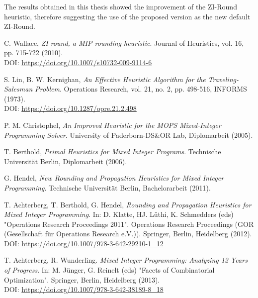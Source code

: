 \documentclass[a4paper,12pt,twoside]{scrbook}
\begin{document}
The results obtained in this thesis showed the improvement of the ZI-Round heuristic, therefore suggesting the use of the proposed version as the new default ZI-Round.

\backmatter

\renewcommand{\listalgorithmcfname}{Algorithms}
\listofalgocfs
\renewcommand{\listfigurename}{Figures}
\listoffigures
\renewcommand{\listtablename}{Tables}
\listoftables

\nocite{*}
\renewcommand{\bibname}{References}
\begin{thebibliography}{9}
	
	 C. Wallace, \textit{ZI round, a MIP rounding heuristic}. Journal of Heuristics, vol. 16, pp. 715-722 (2010). \\ DOI: \url{https://doi.org/10.1007/s10732-009-9114-6}

	 S. Lin, B. W. Kernighan, \textit{An Effective Heuristic Algorithm for the Traveling-Salesman Problem}. Operations Research, vol. 21, no. 2, pp. 498-516, INFORMS (1973). \\ DOI: \url{https://doi.org/10.1287/opre.21.2.498}

	 P. M. Christophel, \textit{An Improved Heuristic for the MOPS Mixed-Integer Programming Solver}. University of Paderborn-DS\&OR Lab, Diplomarbeit (2005).

	 T. Berthold, \textit{Primal Heuristics for Mixed Integer Programs}. Technische Universität Berlin, Diplomarbeit (2006).

	 G. Hendel, \textit{New Rounding and Propagation Heuristics for Mixed Integer Programming}. Technische Universität Berlin, Bachelorarbeit (2011).

	 T. Achterberg, T. Berthold, G. Hendel, \textit{Rounding and Propagation Heuristics for Mixed Integer Programming}. In: D. Klatte, HJ. Lüthi, K. Schmedders (eds) "Operations Research Proceedings 2011". Operations Research Proceedings (GOR (Gesellschaft für Operations Research e.V.)). Springer, Berlin, Heidelberg (2012). \\ DOI: \url{https://doi.org/10.1007/978-3-642-29210-1_12}

	 T. Achterberg, R. Wunderling. \textit{Mixed Integer Programming: Analyzing 12 Years of Progress}. In: M. Jünger, G. Reinelt (eds) "Facets of Combinatorial Optimization". Springer, Berlin, Heidelberg (2013). \\ DOI: \url{https://doi.org/10.1007/978-3-642-38189-8_18}


\end{thebibliography}
\end{document}
